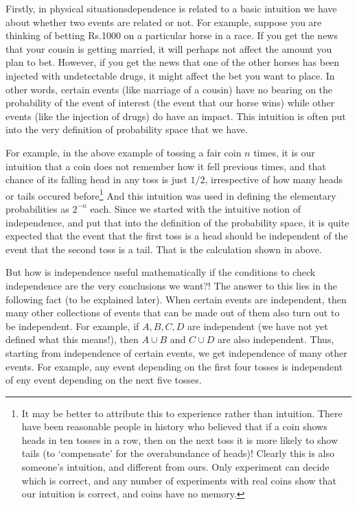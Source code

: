 \documentclass[preprint,  11pt]{amsart}
\begin{document}
Firstly, in physical situationsdependence is related to a basic intuition we have about whether two events are related or not. For example, suppose you are thinking of betting Rs.1000 on a particular horse in a race. If you get the news that your cousin is getting married, it will perhaps not affect the amount you plan to bet. However, if you get the news that one of the other horses has been injected with undetectable drugs, it might affect the bet you want to place. In other words, certain events (like marriage of a cousin) have no bearing on the probability of the event of interest (the event that our horse wins) while other events (like the injection of drugs) do have an impact. This intuition is often put into the very definition of probability space that we have. 

For example, in the above example of tossing a fair coin $n$ times, it is our intuition that a coin does not remember how it fell previous times, and that chance of its falling head in any toss is just $1/2$, irrespective of how many heads or tails occured before\footnote{It may be better to attribute this to experience rather than intuition. There have been reasonable people in history who believed that if a coin shows heads in ten tosses in a row, then on the next toss it is more likely to show tails (to `compensate' for the overabundance of heads)! Clearly this is also someone's intuition, and different from ours. Only experiment can decide which is correct, and any number of experiments with real coins show that our intuition is correct, and coins have no memory.} And this intuition was used in defining the elementary probabilities as $2^{-n}$ each. Since we started with the intuitive notion of independence, and put that into the definition of the probability space, it is quite expected that the event that the first toss is a head should be independent of the event that the second toss is a tail. That is the calculation shown in above.

But how is independence useful mathematically if the conditions to check independence are the very conclusions we want?! The answer to this lies in the following fact (to be explained later). When certain events are independent, then many other collections of events that can be made out of them also turn out to be independent. For example, if $A,B,C,D$ are independent (we have not yet defined what this means!), then $A\cup B$ and $C\cup D$ are also independent. Thus, starting from independence of certain events, we get independence of many other events. For example, any event depending on the first four tosses is independent of eny event depending on the next five tosses.
\end{document}
